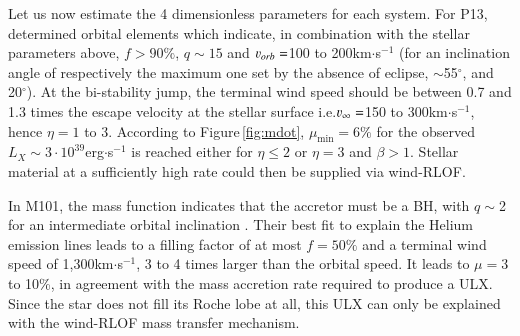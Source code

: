 \documentclass[letter]{aa}
\makeatletter
\newcommand{\ulx}{ULX\xspace}
\newcommand*{\rlof}{RLOF\@\xspace}
\newcommand*{\ns}{NS\@\xspace}
\newcommand*{\bh}{BH\@\xspace}
\newcommand*{\ie}{i.e.\@\xspace}
\makeatother
\begin{document}
Let us now estimate the 4 dimensionless parameters for each system. For P13, \cite{Fuerst2018} determined orbital elements which indicate, in combination with the stellar parameters above, $f>90\%$, $q\sim 15$ and $\varv_{orb}=$100 to 200km$\cdot$s$^{-1}$ (for an inclination angle of respectively the maximum one set by the absence of eclipse, $\sim$55$^{\circ}$, and 20$^{\circ}$). At the bi-stability jump, the terminal wind speed should be between 0.7 and 1.3 times the escape velocity at the stellar surface \ie $\varv_{\infty}=$150 to 300km$\cdot$s$^{-1}$, hence $\eta=1$ to 3. According to Figure\,\ref{fig:mdot}, $\mu_{\text{min}}=6\%$ for the observed $L_X\sim 3\cdot 10^{39}$erg$\cdot$s$^{-1}$ is reached either for $\eta\le2$ or $\eta=3$ and $\beta>1$. Stellar material at a sufficiently high rate could then be supplied via wind-\rlof. 

In M101, the mass function indicates that the accretor must be a \bh, with $q\sim$2 for an intermediate orbital inclination \citep{Liu2013}. Their best fit to explain the Helium emission lines leads to a filling factor of at most $f=50\%$ and a terminal wind speed of 1,300km$\cdot$s$^{-1}$, 3 to 4 times larger than the orbital speed. It leads to $\mu=$3 to 10\%, in agreement with the mass accretion rate required to produce a \ulx. Since the star does not fill its Roche lobe at all, this \ulx can only be explained with the wind-\rlof mass transfer mechanism.
\end{document}
